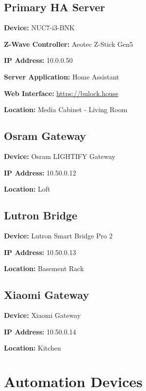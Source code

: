 \documentclass[]{article}
\begin{document}
\begin{multicols}{2}

\subsection{\texorpdfstring{{Primary HA Server}}{Primary HA Server}}

\textbf{Device: }
{NUC7-i3-BNK}

\textbf{Z-Wave Controller: }
{Aeotec Z-Stick Gen5}

\textbf{IP Address: }
{10.0.0.50}

\textbf{Server Application: }
{Home Assistant}

\textbf{Web Interface: }
{\href{https://www.google.com/url?q=https://bulock.house\&sa=D\&ust=1544293200077000}{https://bulock.house}}

\textbf{Location: }
{Media Cabinet - Living Room}

\subsection{\texorpdfstring{{Osram Gateway}}{Osram Gateway}}

\textbf{Device: }
{Osram LIGHTIFY Gateway}

\textbf{IP Address: }
{10.50.0.12}

\textbf{Location: }
{Loft}

\subsection{\texorpdfstring{{Lutron Bridge}}{Lutron Bridge}}

\textbf{Device: }
{Lutron Smart Bridge Pro 2}

\textbf{IP Address: }
{10.50.0.13}

\textbf{Location: }
{Basement Rack}

\subsection{\texorpdfstring{{Xiaomi Gateway}}{Xiaomi Gateway}}

\textbf{Device: }
{Xiaomi Gateway}

\textbf{IP Address: }
{10.50.0.14}

\textbf{Location: }
{Kitchen}


\newpage

\vspace{\baselineskip}\section*{Automation Devices}


\end{multicols}
\end{document}
